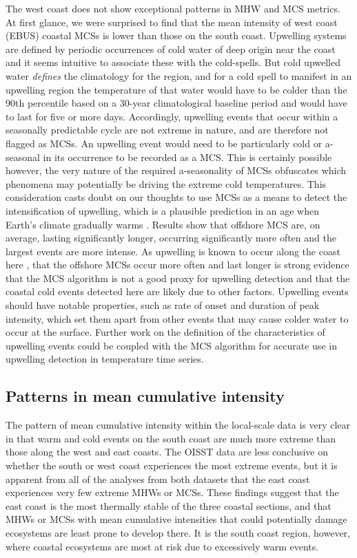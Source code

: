 \documentclass[a4paper,10pt,review]{elsarticle}
\begin{document}
The west coast does not show exceptional patterns in MHW and MCS metrics. At first glance, we were surprised to find that the mean intensity of west coast (EBUS) coastal MCSs is lower than those on the south coast. Upwelling systems are defined by periodic occurrences of cold water of deep origin near the coast \citep{Lutjeharms2000, Hutchings2009} and it seems intuitive to associate these with the cold-spells. But cold upwelled water \emph{defines} the climatology for the region, and for a cold spell to manifest in an upwelling region the temperature of that water would have to be colder than the 90th percentile based on a 30-year climatological baseline period and would have to last for five or more days. Accordingly, upwelling events that occur within a seasonally predictable cycle are not extreme in nature, and are therefore not flagged as MCSs. An upwelling event would need to be particularly cold or a-seasonal in its occurrence to be recorded as a MCS. This is certainly possible however, the very nature of the required a-seasonality of MCSs obfuscates which phenomena may potentially be driving the extreme cold temperatures. This consideration casts doubt on our thoughts to use MCSs as a means to detect the intensification of upwelling, which is a plausible prediction in an age when Earth's climate gradually warms \citep{Garcia-Reyes2015}. Results show that offshore MCS are, on average, lasting significantly longer, occurring significantly more often and the largest events are more intense. As upwelling is known to occur along the coast here \citep{Hutchings2009}, that the offshore MCSs occur more often and last longer is strong evidence that the MCS algorithm is not a good proxy for upwelling detection and that the coastal cold events detected here are likely due to other factors. Upwelling events should have notable properties, such as rate of onset and duration of peak intensity, which set them apart from other events that may cause colder water to occur at the surface. Further work on the definition of the characteristics of upwelling events could be coupled with the MCS algorithm for accurate use in upwelling detection in temperature time series.

\subsection{Patterns in mean cumulative intensity}
The pattern of mean cumulative intensity within the local-scale data is very clear in that warm and cold events on the south coast are much more extreme than those along the west and east coasts. The OISST data are less conclusive on whether the south or west coast experiences the most extreme events, but it is apparent from all of the analyses from both datasets that the east coast experiences very few extreme MHWs or MCSs. These findings suggest that the east coast is the most thermally stable of the three coastal sections, and that MHWs or MCSs with mean cumulative intensities that could potentially damage ecosystems are least prone to develop there. It is the south coast region, however, where coastal ecosystems are most at risk due to excessively warm events.
\end{document}
